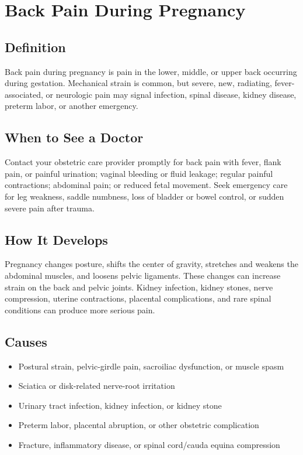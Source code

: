 \chapter{Back Pain During Pregnancy}

\section*{Definition}
Back pain during pregnancy is pain in the lower, middle, or upper back occurring during gestation. Mechanical strain is common, but severe, new, radiating, fever-associated, or neurologic pain may signal infection, spinal disease, kidney disease, preterm labor, or another emergency.

\section*{When to See a Doctor}
Contact your obstetric care provider promptly for back pain with fever, flank pain, or painful urination; vaginal bleeding or fluid leakage; regular painful contractions; abdominal pain; or reduced fetal movement. Seek emergency care for leg weakness, saddle numbness, loss of bladder or bowel control, or sudden severe pain after trauma.

\section*{How It Develops}
Pregnancy changes posture, shifts the center of gravity, stretches and weakens the abdominal muscles, and loosens pelvic ligaments. These changes can increase strain on the back and pelvic joints. Kidney infection, kidney stones, nerve compression, uterine contractions, placental complications, and rare spinal conditions can produce more serious pain.

\section*{Causes}
\begin{itemize}
  \item Postural strain, pelvic-girdle pain, sacroiliac dysfunction, or muscle spasm
  \item Sciatica or disk-related nerve-root irritation
  \item Urinary tract infection, kidney infection, or kidney stone
  \item Preterm labor, placental abruption, or other obstetric complication
  \item Fracture, inflammatory disease, or spinal cord/cauda equina compression
\end{itemize}

